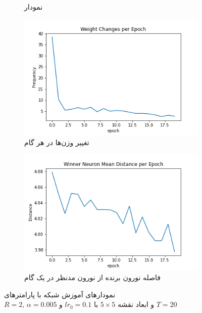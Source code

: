 \documentclass[12pt, a4paper]{article}
\begin{document}
\begin{figure}[h]
\begin{subfigure}{0.45\linewidth}
        \caption{نمودار }
    \end{subfigure}
    \newline
    \begin{subfigure}{0.45\linewidth}
        \includegraphics[width=\linewidth]{images/q5/r2/weight_change.png}
        \caption{تغییر وزن‌ها در هر گام}
    \end{subfigure}
    \hfill
    \begin{subfigure}{0.45\linewidth}
        \includegraphics[width=\linewidth]{images/q5/r2/winner_distance.png}
        \caption{فاصله نورون برنده از نورون مدنظر در یک گام}
    \end{subfigure}
    \caption{نمودار‌های آموزش شبکه  با پارامتر‌های \\$R=2$, $\alpha=0.005$ و ابعاد نقشه $5 \times 5$ با $lr_0=0.1$ و $T=20$}
    \label{r2}
\end{figure}
\end{document}

